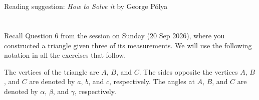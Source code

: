\documentclass[12pt]{exam}
\begin{document}
\section*{}
Reading suggestion: \emph{How to Solve it} by George P\'{o}lya
\section*{}
Recall Question 6 from the session on Sunday (20 Sep 2026), where you constructed a triangle given three of its measurements. We will use the following notation in all the exercises that follow.

\begin{figure}[h]
\end{figure}

The vertices of the triangle are \textcolor{xkcdPurple}{$A$}, \textcolor{xkcdPurple}{$B$}, and \textcolor{xkcdPurple}{$C$}. The sides opposite the vertices \textcolor{xkcdPurple}{$A$}, \textcolor{xkcdPurple}{$B$}, and \textcolor{xkcdPurple}{$C$} are denoted by \textcolor{xkcdBrown}{$a$}, \textcolor{xkcdBrown}{$b$}, and \textcolor{xkcdBrown}{$c$}, respectively. The angles at \textcolor{xkcdPurple}{$A$}, \textcolor{xkcdPurple}{$B$}, and \textcolor{xkcdPurple}{$C$} are denoted by \textcolor{xkcdTeal}{$\alpha$}, \textcolor{xkcdTeal}{$\beta$}, and \textcolor{xkcdTeal}{$\gamma$}, respectively.
\end{document}
